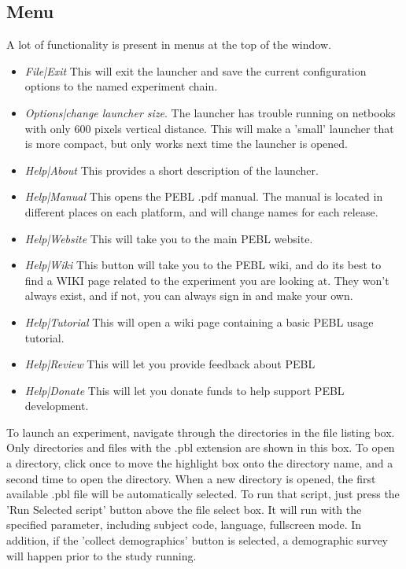 \subsection{Menu}
A lot of functionality is present in menus at the top of the window. 

\begin{itemize}
\item \emph{File|Exit} This will exit the launcher and save the current
  configuration options to the named experiment chain.
\item \emph{Options|change launcher size}. The launcher has trouble running on netbooks with only 600 pixels vertical distance.  This will make a 'small' launcher that is more compact, but only works next time the launcher is opened.

\item \emph{Help|About} This provides a short description of the launcher.

\item \emph{Help|Manual} This opens the PEBL .pdf manual.  The manual
  is located in different places on each platform, and will change
  names for each release.


\item \emph{Help|Website}  This will take you to the main PEBL website.

\item \emph{Help|Wiki} This button will take you to the PEBL wiki, and do
  its best to find a WIKI page related to the experiment you are
  looking at. They won't always exist, and if not, you can always sign
  in and make your own.

\item \emph{Help|Tutorial} This will open a wiki page containing a basic PEBL usage tutorial.

\item \emph{Help|Review} This will let you provide feedback about PEBL
\item \emph{Help|Donate} This will let you donate funds to help support PEBL development.

\end{itemize}


To launch an experiment, navigate through the directories in the file listing box.  Only directories and files with the .pbl extension are shown in this box.  To open a directory, click once to move the highlight box onto the directory name, and a second time to open the directory.  When a new directory is opened, the first available .pbl file will be automatically selected.  To run that script, just press the 'Run Selected script' button above the file select box.  It will run with the specified parameter, including subject code, language, fullscreen mode.  In addition, if the 'collect demographics' button is selected, a demographic survey will happen prior to the study running.

